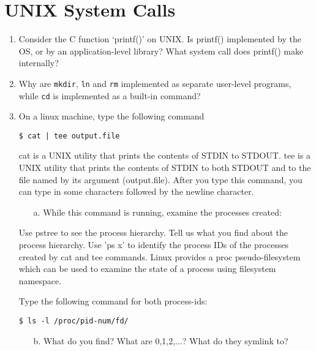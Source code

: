 \addtolength{\oddsidemargin}{-.875in}
\addtolength{\evensidemargin}{-.875in}
\addtolength{\textwidth}{1.75in}
\addtolength{\topmargin}{-.875in}
\addtolength{\textheight}{1.75in}

\section{UNIX System Calls}
\begin{enumerate}
\item Consider the C function ‘printf()’ on UNIX. Is printf() implemented by the OS,
or by an
application-level library? What system call does
printf() make internally? 

\item Why are {\tt mkdir}, {\tt ln} and {\tt rm} implemented as separate user-level programs, while {\tt cd} is implemented as a built-in command?

\item On a linux machine, type the following command
\begin{verbatim}
$ cat | tee output.file
\end{verbatim}
cat is a UNIX utility that prints the contents of STDIN to STDOUT. tee is a UNIX utility that prints the contents of STDIN to both STDOUT and to the file named by its argument (output.file). After you type this command, you can type in some characters followed by the newline character.

\begin{enumerate}
\item[a.] While this command is running, examine the processes created:
\end{enumerate}

Use pstree to see the process hierarchy. Tell us what you find about the process hierarchy.
Use 'ps x' to identify the process IDs of the processes created by cat and tee commands. Linux provides a proc pseudo-filesystem which can be used to examine the state of a process using filesystem namespace.

Type the following command for both process-ids:
\begin{verbatim}
$ ls -l /proc/pid-num/fd/
\end{verbatim}

\begin{enumerate}
\item[b.] What do you find? What are 0,1,2,...? What do they symlink to?
\end{enumerate}


\end{enumerate}
